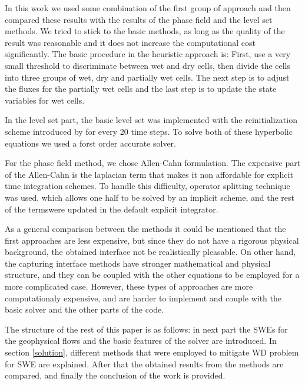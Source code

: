 \documentclass[letterpaper,10pt]{article}
\begin{document}
In this work we used some combination of the first group of approach and then compared these results with the results of the 
phase field and the level set methods. We tried to stick to the basic methods, as long as the quality of the result was
reasonable and it does not increase the computational cost significantly.\newline
The basic procedure in the heuristic approach is: First, use a very small threshold 
to discriminate between wet and dry cells, then divide the cells into three groups of wet, dry and partially wet cells.
The next step is to adjust the fluxes for the partially wet cells and the last step is to update the state variables for wet cells.\newline

In the level set part, the basic level set was implemented \cite{} with the reinitialization scheme introduced by \cite{} 
for every 20 time steps. To solve both of these hyperbolic equations we used a forst order accurate solver.\newline

For the phase field method, we chose Allen-Cahn formulation. The expensive part of the Allen-Cahn is the laplacian term
that makes it non affordable for explicit time integration schemes. To handle this difficulty, operator splitting technique was 
used, which allows one half to be solved by an implicit scheme, and the rest of the termswere updated in the default explicit 
integrator.\newline

As a general comparison between the methods it could be mentioned that the first approaches are less expensive, but since 
they do not have a rigorous physical background, the obtained interface not be realistically pleasable. 
On other hand, the capturing interface methods have stronger mathematical and physical structure, and they can be coupled 
with the other equations to be employed for a more complicated case. 
However, these types of approaches are more computationaly expensive, and are harder to implement and couple with the basic solver
and the other parts of the code.\newline

The structure of the rest of this paper is as follows: in next part the SWEs for the geophysical flows and the basic 
features of the solver are introduced. In section \ref{solution}, 
different methods that were employed to mitigate WD problem for SWE are explained. After that the obtained 
results from the methods are compared, and finally the conclusion of the work is provided.
\end{document}
